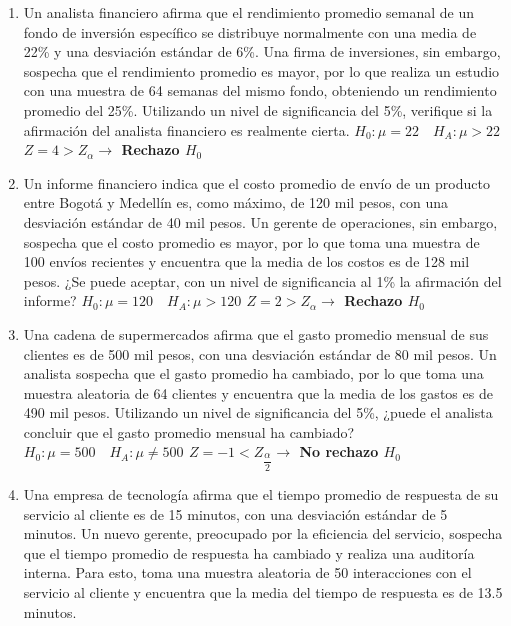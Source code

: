 \documentclass[letterpaper]{article}
\begin{document}
\begin{enumerate}
\item Un analista financiero afirma que el rendimiento promedio semanal de un fondo de inversión específico se distribuye normalmente con una media de 22\% y una desviación estándar de 6\%. Una firma de inversiones, sin embargo, sospecha que el rendimiento promedio es mayor, por lo que realiza un estudio con una muestra de 64 semanas del mismo fondo, obteniendo un rendimiento promedio del 25\%. Utilizando un nivel de significancia del 5\%, verifique si la afirmación del analista financiero es realmente cierta. {\bf $H_0: \mu=22 \quad H_A: \mu > 22$ $Z=4>Z_{\alpha} \rightarrow$ Rechazo $H_0$}

\item Un informe financiero indica que el costo promedio de envío de un producto entre Bogotá y Medellín es, como máximo, de 120 mil pesos, con una desviación estándar de 40 mil pesos. Un gerente de operaciones, sin embargo, sospecha que el costo promedio es mayor, por lo que toma una muestra de 100 envíos recientes y encuentra que la media de los costos es de 128 mil pesos. ¿Se puede aceptar, con un nivel de significancia al 1\% la afirmación del informe? {\bf $H_0: \mu=120 \quad H_A: \mu > 120$ $Z=2>Z_{\alpha} \rightarrow$ Rechazo $H_0$}


\item Una cadena de supermercados afirma que el gasto promedio mensual de sus clientes es de 500 mil pesos, con una desviación estándar de 80 mil pesos. Un analista sospecha que el gasto promedio ha cambiado, por lo que toma una muestra aleatoria de 64 clientes y encuentra que la media de los gastos es de 490 mil pesos. Utilizando un nivel de significancia del 5\%, ¿puede el analista concluir que el gasto promedio mensual ha cambiado? {\bf $H_0: \mu=500 \quad H_A: \mu \neq 500$ $Z=-1<Z_{\dfrac{\alpha}{2}} \rightarrow$ No rechazo $H_0$}

\item Una empresa de tecnología afirma que el tiempo promedio de respuesta de su servicio al cliente es de 15 minutos, con una desviación estándar de 5 minutos. Un nuevo gerente, preocupado por la eficiencia del servicio, sospecha que el tiempo promedio de respuesta ha cambiado y realiza una auditoría interna. Para esto, toma una muestra aleatoria de 50 interacciones con el servicio al cliente y encuentra que la media del tiempo de respuesta es de 13.5 minutos.


\end{enumerate}
\end{document}
